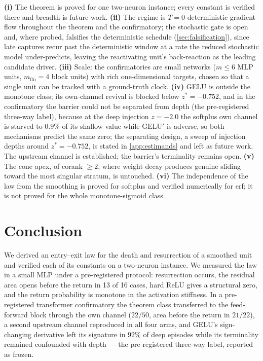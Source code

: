 \documentclass[11pt]{article}
\theoremstyle{definition}
\theoremstyle{remark}
\begin{document}
\textbf{(i)} The theorem is proved for one two-neuron instance; every constant is
verified there and breadth is future work.
\textbf{(ii)} The regime is $T=0$ deterministic gradient flow throughout the
theorem and the confirmatory; the stochastic gate is open and, where probed,
falsifies the deterministic schedule (\cref{sec:falsification}), since late
captures recur past the deterministic window at a rate the reduced stochastic
model under-predicts, leaving the reactivating unit's back-reaction as the
leading candidate driver.
\textbf{(iii)} Scale: the confirmatories are small networks ($m\le6$ MLP units,
$m_{\mathrm{ffn}}=4$ block units) with rich one-dimensional targets, chosen so
that a single unit can be tracked with a ground-truth clock.
\textbf{(iv)} GELU is outside the monotone class; its own-channel revival is
blocked below $z^\ast=-0.752$, and in the confirmatory the barrier could not be
separated from depth (the pre-registered three-way label), because at the deep
injection $z=-2.0$ the softplus own channel is starved to $0.9\%$ of its shallow
value while $\mathrm{GELU}'$ is adverse, so both mechanisms predict the same
zero; the separating design, a sweep of injection depths around
$z^\ast=-0.752$, is stated in \cref{app:estimands} and left as future work. The
upstream channel is established; the barrier's terminality remains open.
\textbf{(v)} The cone apex, of corank $\ge2$, where weight decay produces genuine
sliding toward the most singular stratum, is untouched.
\textbf{(vi)} The independence of the law from the smoothing is proved for
softplus and verified numerically for erf; it is not proved for the whole
monotone-sigmoid class.

\section{Conclusion}\label{sec:conclusion}

We derived an entry--exit law for the death and resurrection of a smoothed unit
and verified each of its constants on a two-neuron instance. We measured the law
in a small MLP under a pre-registered protocol: resurrection occurs, the residual
area opens before the return in 13 of 16 cases, hard ReLU gives a structural
zero, and the return probability is monotone in the activation stiffness. In a pre-registered transformer confirmatory the theorem class transferred to
the feed-forward block through the own channel ($22/50$, area before the return
in $21/22$), a second upstream channel reproduced in all four arms, and GELU's
sign-changing derivative left its signature in $92\%$ of deep episodes while its
terminality remained confounded with depth --- the pre-registered three-way
label, reported as frozen.
\end{document}
